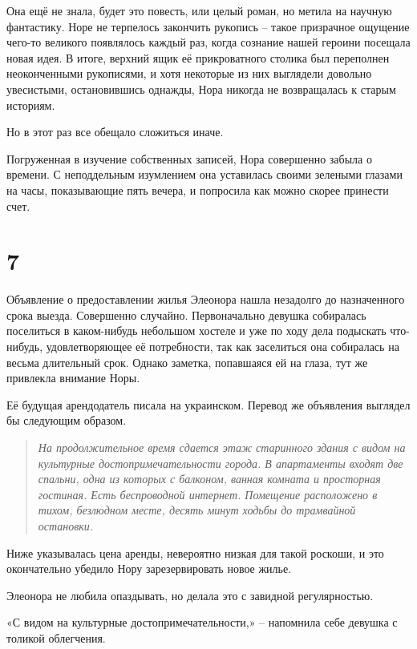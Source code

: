 \documentclass[
  a5paperpaper,
  DIV=11,
  numbers=noendperiod]{scrreprt}
\begin{document}
Она ещё не знала, будет это повесть, или целый роман, но метила на
научную фантастику. Норе не терпелось закончить рукопись -- такое
призрачное ощущение чего-то великого появлялось каждый раз, когда
сознание нашей героини посещала новая идея. В итоге, верхний ящик её
прикроватного столика был переполнен неоконченными рукописями, и хотя
некоторые из них выглядели довольно увесистыми, остановившись однажды,
Нора никогда не возвращалась к старым историям.

Но в этот раз все обещало сложиться иначе.

Погруженная в изучение собственных записей, Нора совершенно забыла о
времени. С неподдельным изумлением она уставилась своими зелеными
глазами на часы, показывающие пять вечера, и попросила как можно скорее
принести счет.

\section*{7}\label{7}


Объявление о предоставлении жилья Элеонора нашла незадолго до
назначенного срока выезда. Совершенно случайно. Первоначально девушка
собиралась поселиться в каком-нибудь небольшом хостеле и уже по ходу
дела подыскать что-нибудь, удовлетворяющее её потребности, так как
заселиться она собиралась на весьма длительный срок. Однако заметка,
попавшаяся ей на глаза, тут же привлекла внимание Норы.

Её будущая арендодатель писала на украинском. Перевод же объявления
выглядел бы следующим образом.

\begin{quote}
\emph{На продолжительное время сдается этаж старинного здания с видом на
культурные достопримечательности города. В апартаменты входят две
спальни, одна из которых с балконом, ванная комната и просторная
гостиная. Есть беспроводной интернет. Помещение расположено в тихом,
безлюдном месте, десять минут ходьбы до трамвайной остановки.}
\end{quote}

Ниже указывалась цена аренды, невероятно низкая для такой роскоши, и это
окончательно убедило Нору зарезервировать новое жилье.

Элеонора не любила опаздывать, но делала это с завидной регулярностью.

«С видом на культурные достопримечательности,» -- напомнила себе девушка
с толикой облегчения.
\end{document}
